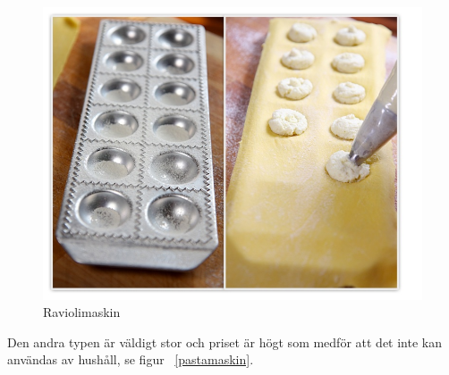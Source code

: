 	\begin{figure}[h]
		\begin{center}
			\includegraphics[scale=0.5]{images/raviolimoldwithfilling.jpg}
			\caption{Raviolimaskin}
			\label{ravioli}	
		\end{center}
	\end{figure}
Den andra typen är väldigt stor och priset är högt som medför att det inte kan användas av hushåll, se figur ~\ref{pastamaskin}.
